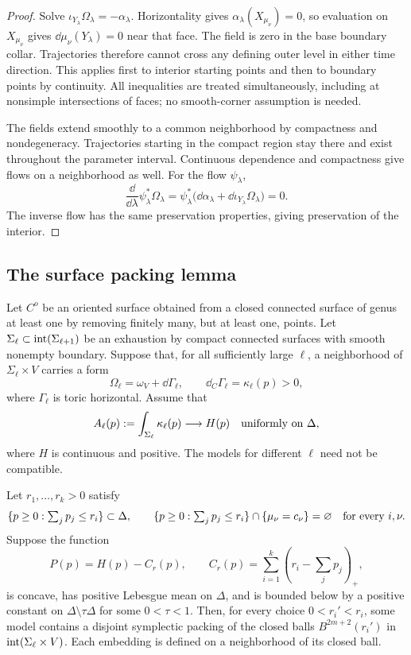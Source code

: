 \begin{proof}
Solve $\iota_{Y_\lambda}\Omega_\lambda=-\alpha_\lambda$.
Horizontality gives $\alpha_\lambda(X_{\mu_\nu})=0$, so evaluation
on $X_{\mu_\nu}$ gives $\dd\mu_\nu(Y_\lambda)=0$ near that face.
The field is zero in the base boundary collar.  Trajectories therefore
cannot cross any defining outer level in either time direction.
This applies first to interior starting points and then to boundary
points by continuity.  All inequalities are treated simultaneously,
including at nonsimple intersections of faces; no smooth-corner
assumption is needed.

The fields extend smoothly to a common neighborhood by compactness
and nondegeneracy.  Trajectories starting in the compact region stay
there and exist throughout the parameter interval.  Continuous
dependence and compactness give flows on a neighborhood as well.
For the flow $\psi_\lambda$,
\[
 \frac{\dd}{\dd\lambda}\psi_\lambda^*\Omega_\lambda
 =\psi_\lambda^*\bigl(\dd\alpha_\lambda+
                \dd\iota_{Y_\lambda}\Omega_\lambda\bigr)=0.
\]
The inverse flow has the same preservation properties, giving
preservation of the interior.
\end{proof}

\subsection{The surface packing lemma}

\begin{lemma}\label{surf:packing}
Let $C^o$ be an oriented surface obtained from a closed connected
surface of genus at least one by removing finitely many, but at least
one, points.  Let $\Sigma_\ell\subset\operatorname{int}(\Sigma_{\ell+1})$ be an
exhaustion by compact connected surfaces with smooth nonempty boundary.
Suppose that, for all sufficiently
large $\ell$, a neighborhood of $\Sigma_\ell\times V$ carries a form
\[
 \Omega_\ell=\omega_V+\dd\Gamma_\ell,\qquad
 \dd_C\Gamma_\ell=\kappa_\ell(p)>0,
\]
where $\Gamma_\ell$ is toric horizontal.  Assume that
\[
 A_\ell(p):=\int_{\Sigma_\ell}\kappa_\ell(p)
       \longrightarrow H(p)
       \quad\hbox{uniformly on }\Delta,
\]
where $H$ is continuous and positive.  The models for different
$\ell$ need not be compatible.

Let $r_1,\ldots,r_k>0$ satisfy
\[
 \{p\geq0:\textstyle\sum_jp_j\leq r_i\}\subset\Delta,
 \qquad
 \{p\geq0:\textstyle\sum_jp_j\leq r_i\}
       \cap\{\mu_\nu=c_\nu\}=\varnothing
       \quad\hbox{for every }i,\nu.
\]
Suppose the function
\[
 P(p)=H(p)-C_r(p),\qquad
 C_r(p)=\sum_{i=1}^k(r_i-\textstyle\sum_jp_j)_+,
\]
is concave, has positive Lebesgue mean on $\Delta$, and is bounded
below by a positive constant on $\Delta\setminus\tau\Delta$ for
some $0<\tau<1$.
Then, for every choice $0<r_i'<r_i$, some model contains a disjoint
symplectic packing of the closed balls $B^{2m+2}(r_i')$ in
$\operatorname{int}(\Sigma_\ell\times V)$.  Each embedding is defined on a
neighborhood of its closed ball.
\end{lemma}

